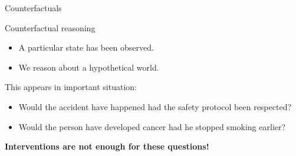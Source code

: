 \documentclass{beamer}
\begin{document}
    \begin{frame}{Counterfactuals}

        \begin{block}{Counterfactual reasoning}
            \begin{itemize}
                \item A particular state has been observed.
                \item We reason about a hypothetical world.
            \end{itemize}
        \end{block}

        This appears in important situation:
        \begin{itemize}
            \item Would the accident have happened had the safety protocol been respected?
            \item Would the person have developed cancer had he stopped smoking earlier?
        \end{itemize}

        \begin{center}
            \bf Interventions are not enough for these questions!
        \end{center}
    \end{frame}
\end{document}

